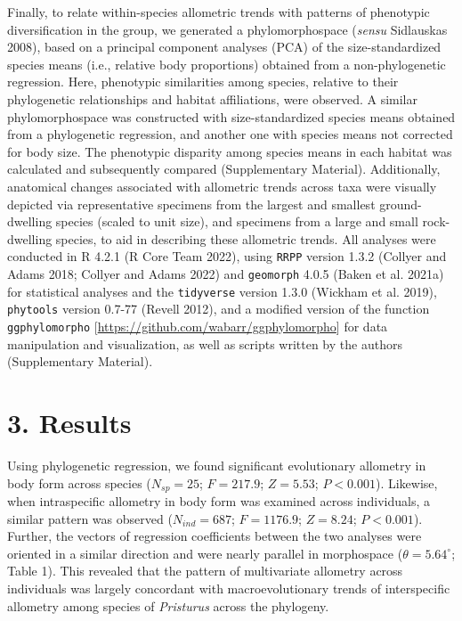 \documentclass[
  11pt,
]{article}
\begin{document}
Finally, to relate within-species allometric trends with patterns of
phenotypic diversification in the group, we generated a phylomorphospace
(\emph{sensu} Sidlauskas 2008), based on a principal component analyses
(PCA) of the size-standardized species means (i.e., relative body
proportions) obtained from a non-phylogenetic regression. Here,
phenotypic similarities among species, relative to their phylogenetic
relationships and habitat affiliations, were observed. A similar
phylomorphospace was constructed with size-standardized species means
obtained from a phylogenetic regression, and another one with species
means not corrected for body size. The phenotypic disparity among
species means in each habitat was calculated and subsequently compared
(Supplementary Material). Additionally, anatomical changes associated
with allometric trends across taxa were visually depicted via
representative specimens from the largest and smallest ground-dwelling
species (scaled to unit size), and specimens from a large and small
rock-dwelling species, to aid in describing these allometric trends. All
analyses were conducted in R 4.2.1 (R Core Team 2022), using
\texttt{RRPP} version 1.3.2 (Collyer and Adams 2018; Collyer and Adams
2022) and \texttt{geomorph} 4.0.5 (Baken et al. 2021a) for statistical
analyses and the \texttt{tidyverse} version 1.3.0 (Wickham et al. 2019),
\texttt{phytools} version 0.7-77 (Revell 2012), and a modified version
of the function \texttt{ggphylomorpho}
{[}\url{https://github.com/wabarr/ggphylomorpho}{]} for data
manipulation and visualization, as well as scripts written by the
authors (Supplementary Material).

\hypertarget{results}{%
\section{3. Results}\label{results}}

Using phylogenetic regression, we found significant evolutionary
allometry in body form across species (\(N_{sp}=25\); \(F = 217.9\);
\(Z =5.53\); \(P < 0.001\)). Likewise, when intraspecific allometry in
body form was examined across individuals, a similar pattern was
observed (\(N_{ind}=687\); \(F = 1176.9\); \(Z =8.24\); \(P < 0.001\)).
Further, the vectors of regression coefficients between the two analyses
were oriented in a similar direction and were nearly parallel in
morphospace (\(\theta = 5.64^\circ\); Table 1). This revealed that the
pattern of multivariate allometry across individuals was largely
concordant with macroevolutionary trends of interspecific allometry
among species of \emph{Pristurus} across the phylogeny. \hfill\break
\end{document}
